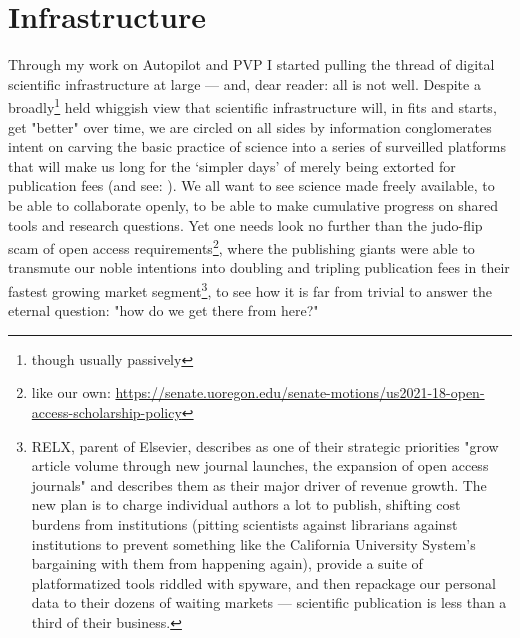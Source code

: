 
\section{Infrastructure}
\label{sec:infrastructure}

Through my work on Autopilot and PVP I started pulling the thread of digital scientific infrastructure at large --- and, dear reader: all is not well. Despite a broadly\footnote{though usually passively} held whiggish view that scientific infrastructure will, in fits and starts, get "better" over time, we are circled on all sides by information conglomerates intent on carving the basic practice of science into a series of surveilled platforms that will make us long for the `simpler days' of merely being extorted for publication fees\cite{pooleySurveillancePublishing2021} (and see: \cite{zuboffBigOtherSurveillance2015}). We all want to see science made freely available, to be able to collaborate openly, to be able to make cumulative progress on shared tools and research questions. Yet one needs look no further than the judo-flip scam of open access requirements\footnote{like our own: \url{https://senate.uoregon.edu/senate-motions/us2021-18-open-access-scholarship-policy}}, where the publishing giants were able to transmute our noble intentions into doubling and tripling publication fees in their fastest growing market segment\footnote{RELX, parent of Elsevier, describes as one of their strategic priorities "grow article volume through new journal launches, the expansion of open access journals" and describes them as their major driver of revenue growth\cite{RELXAnnualReport2020}. The new plan is to charge individual authors a lot to publish, shifting cost burdens from institutions (pitting scientists against librarians against institutions to prevent something like the California University System's bargaining with them from happening again), provide a suite of platformatized tools riddled with spyware, and then repackage our personal data to their dozens of waiting markets --- scientific publication is less than a third of their business.}, to see how it is far from trivial to answer the eternal question: "how do we get there from here?" 

